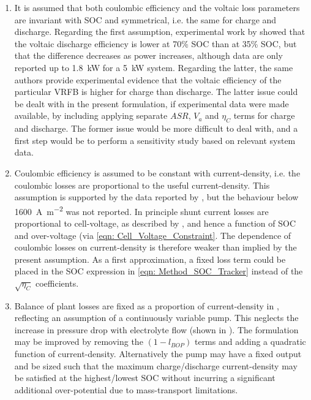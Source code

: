 \documentclass[preprint,3p,review,authoryear,10pt]{elsarticle}
\begin{document}
\begin{enumerate}

    \item It is assumed that both coulombic efficiency and the voltaic loss parameters are invariant with SOC and symmetrical, i.e. the same for charge and discharge. Regarding the first assumption, experimental work by \cite{Nguyen2014} showed that the voltaic discharge efficiency is lower at 70\% SOC than at 35\% SOC, but that the difference decreases as power increases, although data are only reported up to \SI{1.8}{\kilo\watt} for a \SI{5}{\kilo\watt} system. Regarding the latter, the same authors provide experimental evidence that the voltaic efficiency of the particular VRFB is higher for charge than discharge. The latter issue could be dealt with in the present formulation, if experimental data were made available, by including applying separate $ASR$, $V_a$ and $\eta_{C}$ terms for charge and discharge. The former issue would be more difficult to deal with, and a first step would be to perform a sensitivity study based on relevant system data.
    
    \item Coulombic efficiency is assumed to be constant with current-density, i.e. the coulombic losses are proportional to the useful current-density. This assumption is supported by the data reported by \cite{Reed2016}, but the behaviour below \SI{1600}{\ampere\per\square\meter} was not reported. In principle shunt current losses are proportional to cell-voltage, as described by \cite{Xing2011}, and hence a function of SOC and over-voltage (via \cref{eqn: Cell_Voltage_Constraint}. The dependence of coulombic losses on current-density is therefore weaker than implied by the present assumption. As a first approximation, a fixed loss term could be placed in the SOC expression in \cref{eqn: Method_SOC_Tracker} instead of the $\sqrt{\eta_C}$ coefficients.
    
    \item Balance of plant losses are fixed as a proportion of current-density in , reflecting an assumption of a continuously variable pump. This neglects the increase in pressure drop with electrolyte flow (shown in \cite{Reed2016}). The formulation may be improved by removing the $(1-l_{BOP})$ terms and adding a quadratic function of current-density. Alternatively the pump may have a  fixed output and be sized such that the maximum charge/discharge current-density may be satisfied at the highest/lowest SOC without incurring a significant additional over-potential due to mass-transport limitations.
    

\end{enumerate}
\end{document}
